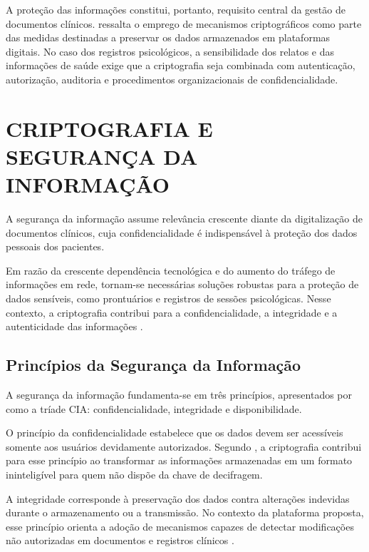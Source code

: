 A proteção das informações constitui, portanto, requisito central da gestão de documentos clínicos.  ressalta o emprego de mecanismos criptográficos como parte das medidas destinadas a preservar os dados armazenados em plataformas digitais. No caso dos registros psicológicos, a sensibilidade dos relatos e das informações de saúde exige que a criptografia seja combinada com autenticação, autorização, auditoria e procedimentos organizacionais de confidencialidade.

\section{CRIPTOGRAFIA E SEGURANÇA DA INFORMAÇÃO}

A segurança da informação assume relevância crescente diante da digitalização de documentos clínicos, cuja confidencialidade é indispensável à proteção dos dados pessoais dos pacientes.

Em razão da crescente dependência tecnológica e do aumento do tráfego de informações em rede, tornam-se necessárias soluções robustas para a proteção de dados sensíveis, como prontuários e registros de sessões psicológicas. Nesse contexto, a criptografia contribui para a confidencialidade, a integridade e a autenticidade das informações \cite{viana2022criptografia}.

\subsection{Princípios da Segurança da Informação}

A segurança da informação fundamenta-se em três princípios, apresentados por  como a tríade CIA: confidencialidade, integridade e disponibilidade.

O princípio da confidencialidade estabelece que os dados devem ser acessíveis somente aos usuários devidamente autorizados. Segundo , a criptografia contribui para esse princípio ao transformar as informações armazenadas em um formato ininteligível para quem não dispõe da chave de decifragem.

A integridade corresponde à preservação dos dados contra alterações indevidas durante o armazenamento ou a transmissão. No contexto da plataforma proposta, esse princípio orienta a adoção de mecanismos capazes de detectar modificações não autorizadas em documentos e registros clínicos \cite{viana2022criptografia}.

